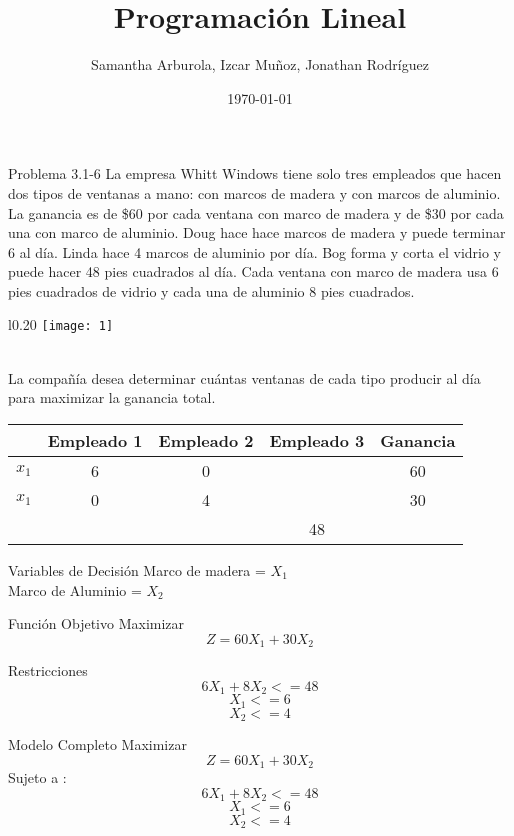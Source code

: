 \documentclass{beamer}
\author{Samantha Arburola, Izcar Muñoz, Jonathan Rodr\'iguez}
\title{Programaci\'on Lineal}
\date{\today}
\begin{document}
\titlepageframe

\begin{frame}[t,fragile]{Problema 3.1-6}
La empresa Whitt Windows tiene solo tres empleados que hacen dos tipos de ventanas a mano: con marcos de madera y con marcos de aluminio. La ganancia es de \$60 por cada ventana con marco de madera y de \$30 por cada una con marco de aluminio. Doug hace hace marcos de madera y puede terminar 6 al d\'ia. Linda hace 4  marcos de aluminio por d\'ia. Bog forma y corta el vidrio y puede hacer 48 pies cuadrados al d\'ia. Cada ventana con marco de madera usa 6 pies cuadrados de vidrio y cada una de aluminio 8 pies cuadrados.\\ 
\begin{wrapfigure}{l}{0.20\textwidth}
    \centering
    \texttt{[image: 1]}
\end{wrapfigure}\\
La compañ\'ia desea determinar cu\'antas ventanas de cada tipo producir al d\'ia para maximizar la ganancia total.\\

\begin{tabular}{|c|c|c|c|c|}
\hline 
  & Empleado 1 & Empleado 2 & Empleado 3 & Ganancia \\ 
\hline 
\(x_{1}\) & 6 & 0 &   & 60 \\ 
\hline 
\(x_{1}\) & 0 & 4 &   &30 \\ 
\hline 
 &  &  & 48 &  \\ 
\hline 
\end{tabular} 

\end{frame}

\begin{frame}[fragile]{Variables de Decisi\'on}
Marco de madera  = \(X_{1}\) \\
Marco de Aluminio = \(X_{2}\)
\end{frame}

\begin{frame}[fragile]{Funci\'on Objetivo}
Maximizar\\
\[Z = 60X_{1} + 30X_{2}\]
\end{frame}

\begin{frame}[fragile]{Restricciones}
\[6X_{1} + 8X_{2} <= 48\]
\[  X_{1} <= 6\]
\[  X_{2} <= 4\]
\end{frame}

\begin{frame}[fragile]{Modelo Completo}
Maximizar\\
\[Z = 60X_{1} + 30X_{2}\]
Sujeto a :\\
\[  6X_{1} + 8X_{2} <= 48\]
\[  X_{1} <= 6\]
\[  X_{2} <= 4\]
\end{frame}
\end{document}
